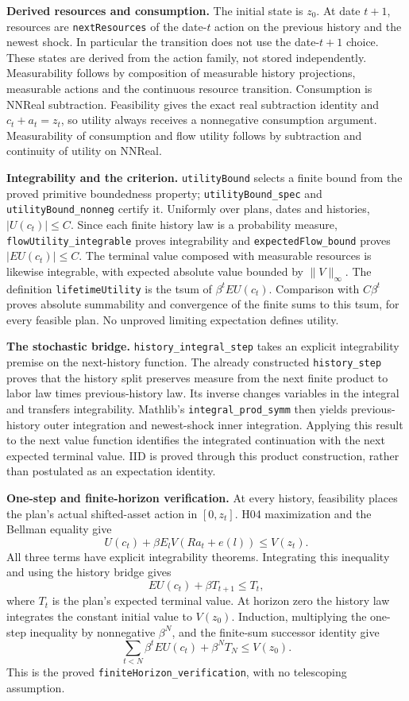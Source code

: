 \documentclass[
  11pt,
]{article}
\let\LedgerOriginalTexttt\texttt
\renewcommand{\texttt}[1]{{\small\LedgerOriginalTexttt{#1}}}
\begin{document}
\textbf{Derived resources and consumption.} The initial state is
\(z_0\). At date \(t+1\), resources are \texttt{nextResources} of the
date-\(t\) action on the previous history and the newest shock. In
particular the transition does not use the date-\(t+1\) choice. These
states are derived from the action family, not stored independently.
Measurability follows by composition of measurable history projections,
measurable actions and the continuous resource transition. Consumption
is NNReal subtraction. Feasibility gives the exact real subtraction
identity and \(c_t+a_t=z_t\), so utility always receives a nonnegative
consumption argument. Measurability of consumption and flow utility
follows by subtraction and continuity of utility on NNReal.

\textbf{Integrability and the criterion.} \texttt{utilityBound} selects
a finite bound from the proved primitive boundedness property;
\texttt{utilityBound\_spec} and \texttt{utilityBound\_nonneg} certify
it. Uniformly over plans, dates and histories, \(|U(c_t)|\leq C\). Since
each finite history law is a probability measure,
\texttt{flowUtility\_integrable} proves integrability and
\texttt{expectedFlow\_bound} proves \(|E U(c_t)|\leq C\). The terminal
value composed with measurable resources is likewise integrable, with
expected absolute value bounded by \(\|V\|_\infty\). The definition
\texttt{lifetimeUtility} is the tsum of \(\beta^t E U(c_t)\). Comparison
with \(C\beta^t\) proves absolute summability and convergence of the
finite sums to this tsum, for every feasible plan. No unproved limiting
expectation defines utility.

\textbf{The stochastic bridge.} \texttt{history\_integral\_step} takes
an explicit integrability premise on the next-history function. The
already constructed \texttt{history\_step} proves that the history split
preserves measure from the next finite product to labor law times
previous-history law. Its inverse changes variables in the integral and
transfers integrability. Mathlib's \texttt{integral\_prod\_symm} then
yields previous-history outer integration and newest-shock inner
integration. Applying this result to the next value function identifies
the integrated continuation with the next expected terminal value. IID
is proved through this product construction, rather than postulated as
an expectation identity.

\textbf{One-step and finite-horizon verification.} At every history,
feasibility places the plan's actual shifted-asset action in
\([0,z_t]\). H04 maximization and the Bellman equality give
\[U(c_t)+\beta E_l V(Ra_t+e(l))\leq V(z_t).\] All three terms have
explicit integrability theorems. Integrating this inequality and using
the history bridge gives \[E U(c_t)+\beta T_{t+1}\leq T_t,\] where
\(T_t\) is the plan's expected terminal value. At horizon zero the
history law integrates the constant initial value to \(V(z_0)\).
Induction, multiplying the one-step inequality by nonnegative
\(\beta^N\), and the finite-sum successor identity give
\[\sum_{t<N}\beta^t E U(c_t)+\beta^N T_N\leq V(z_0).\] This is the
proved \texttt{finiteHorizon\_verification}, with no telescoping
assumption.
\end{document}
